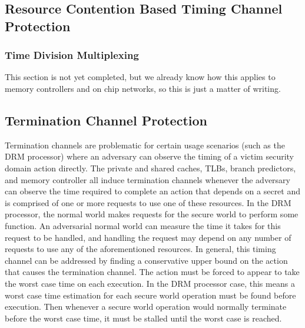 \subsection{Resource Contention Based Timing Channel Protection}
\subsubsection{Time Division Multiplexing}
This section is not yet completed, but we already know how this applies to 
memory controllers and on chip networks, so this is just a matter of writing.

\subsection{Termination Channel Protection}
Termination channels are problematic for certain usage scenarios (such as the 
DRM processor) where an adversary can observe the timing of a victim security 
domain action directly.  The private and shared caches, TLBs, branch 
predictors, and memory controller all induce termination channels whenever the 
adversary can observe the time required to complete an action that depends on a 
secret and is comprised of one or more requests to use one of these resources. 
In the DRM processor, the normal world makes requests for the secure world to 
perform some function. An adversarial normal world can measure the time it 
takes for this request to be handled, and handling the request may depend on 
any number of requests to use any of the aforementioned resources. In general, 
this timing channel can be addressed by finding a conservative upper bound on 
the action that causes the termination channel. The action must be forced to 
appear to take the worst case time on each execution. In the DRM processor 
case, this means a worst case time estimation for each secure world operation 
must be found before execution. Then whenever a secure world operation would 
normally terminate before the worst case time, it must be stalled until the 
worst case is reached.
